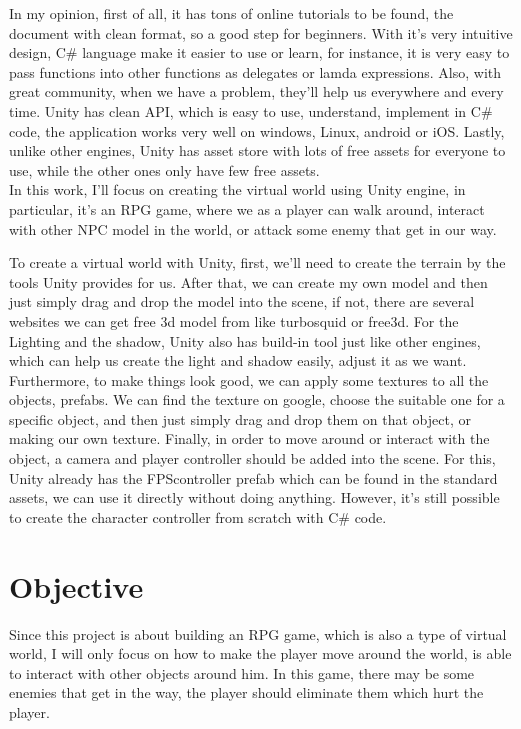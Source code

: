\documentclass[a4paper, 13pt]{extarticle}
\begin{document}
 In my opinion, first of all, it has tons of online tutorials to be found, the document with clean format, so a good step for beginners. With it's very intuitive design, C\# language make it easier to use or learn, for instance, it is very easy to pass functions into other functions as delegates or lamda expressions. Also, with great community, when we have a problem, they'll help us everywhere and every time. Unity has clean API, which is easy to use, understand, implement in C\# code, the application works very well on windows, Linux, android or iOS. Lastly, unlike other engines, Unity has asset store with lots of free assets for everyone to use, while the other ones only have few free assets. \\[0.35cm]In this work, I'll focus on creating the virtual world using Unity engine, in particular, it's an RPG game, where we as a player can walk around, interact with other NPC model in the world, or attack some enemy that get in our way. 
  

 To create a virtual world with Unity, first, we'll need to create the terrain by the tools Unity provides for us. After that, we can create my own model and then just simply drag and drop the model into the scene, if not, there are several websites we can get free 3d model from like turbosquid or free3d. For the Lighting and the shadow, Unity also has build-in tool just like other engines, which can help us create the light and shadow easily, adjust it as we want. Furthermore, to make things look good, we can apply some textures to all the objects, prefabs. We can find the texture on google, choose the suitable one for a specific object, and then just simply drag and drop them on that object, or making our own texture. Finally, in order to move around or interact with the object, a camera and player controller should be added into the scene. For this, Unity already has the FPScontroller prefab which can be found in the standard assets, we can use it directly without doing anything. However, it's still possible to create the character controller from scratch with C\# code.
 \section{\Large Objective} 
 	Since this project is about building an RPG game, which is also a type of virtual world, I will only focus on how to make the player move around the world, is able to interact with other objects around him. In this game, there may be some enemies that get in the way, the player should eliminate them which hurt the player. 
\end{document}
